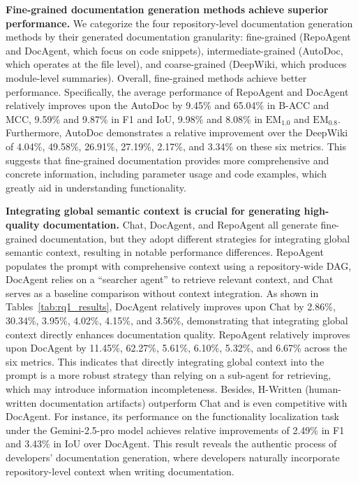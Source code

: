 \textbf{Fine-grained documentation generation methods achieve superior performance.} We categorize the four repository-level documentation generation methods by their generated documentation granularity: fine-grained (RepoAgent and DocAgent, which focus on code snippets), intermediate-grained (AutoDoc, which operates at the file level), and coarse-grained (DeepWiki, which produces module-level summaries). Overall, fine-grained methods achieve better performance. Specifically, the average performance of RepoAgent and DocAgent relatively improves upon the AutoDoc by 9.45\% and 65.04\% in B-ACC and MCC, 9.59\% and 9.87\% in F1 and IoU, 9.98\% and 8.08\% in $\text{EM}_{1.0}$ and $\text{EM}_{0.8}$. Furthermore, AutoDoc demonstrates a relative improvement over the DeepWiki of 4.04\%, 49.58\%, 26.91\%, 27.19\%, 2.17\%, and 3.34\% on these six metrics. This suggests that fine-grained documentation provides more comprehensive and concrete information, including parameter usage and code examples, which greatly aid in understanding functionality.

\textbf{Integrating global semantic context is crucial for generating high-quality documentation.} Chat, DocAgent, and RepoAgent all generate fine-grained documentation, but they adopt different strategies for integrating global semantic context, resulting in notable performance differences. RepoAgent populates the prompt with comprehensive context using a repository-wide DAG, DocAgent relies on a ``searcher agent'' to retrieve relevant context, and Chat serves as a baseline comparison without context integration. As shown in Tables~\ref{tab:rq1_results}, DocAgent relatively improves upon Chat by 2.86\%, 30.34\%, 3.95\%, 4.02\%, 4.15\%, and 3.56\%, demonstrating that integrating global context directly enhances documentation quality. 
RepoAgent relatively improves upon DocAgent by 11.45\%, 62.27\%, 5.61\%, 6.10\%, 5.32\%, and 6.67\% across the six metrics. This indicates that directly integrating global context into the prompt is a more robust strategy than relying on a sub-agent for retrieving, which may introduce information incompleteness. Besides, H-Written (human-written documentation artifacts) outperform Chat and is even competitive with DocAgent. For instance, its performance on the functionality localization task under the Gemini-2.5-pro model achieves relative improvements of 2.49\% in F1 and 3.43\% in IoU over DocAgent. This result reveals the authentic process of developers' documentation generation, where developers naturally incorporate repository-level context when writing documentation.

